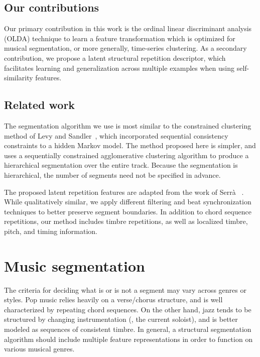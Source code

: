 \documentclass{article}
\begin{document}
\subsection{Our contributions}
Our primary contribution in this work is the ordinal linear discriminant analysis (OLDA) technique to learn a 
feature transformation which is optimized for musical segmentation, or more generally, time-series clustering.
As a secondary contribution, we propose a latent structural repetition descriptor, which facilitates learning and
generalization across multiple examples when using self-similarity features.

\subsection{Related work}
\label{sec:related}

The segmentation algorithm we use is most similar to the constrained clustering method of Levy and
Sandler~\cite{levy2008structural}, which incorporated sequential consistency constraints to a hidden Markov model. 
The method proposed here is simpler, and uses a sequentially constrained agglomerative clustering algorithm to 
produce a hierarchical segmentation over the entire track.  
Because the segmentation is hierarchical, the number of segments need not be specified in advance.

The proposed latent repetition features are adapted from the work of Serr\`{a}
\etal~\cite{serra2012unsupervised}. While qualitatively similar, we apply different filtering and
beat synchronization techniques to better preserve segment boundaries. 
In addition to chord sequence repetitions, our method includes timbre repetitions, as well as 
localized timbre, pitch, and timing information.

\section{Music segmentation}
\label{sec:features}
The criteria for deciding what is or is not a segment may vary across genres or styles.  
Pop music relies heavily on a verse/chorus structure, and is well characterized by repeating chord sequences. 
On the other hand, jazz tends to be structured by changing instrumentation (\eg, the current soloist),
and is better modeled as sequences of consistent timbre.
In general, a structural segmentation algorithm should include multiple feature representations in order to function
on various musical genres.
\end{document}
